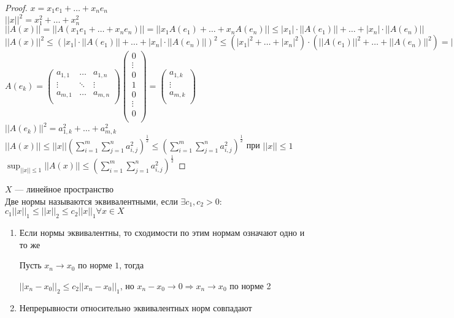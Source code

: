 \begin{proof}
$x = x_1e_1 + \dots + x_n e_n$ \\
$||x||^2 = x_1^2 + \dots + x_n^2$ \\
$||A(x)|| = ||A(x_1e_1 + \dots + x_n e_n)|| = ||x_1A(e_1) + \dots + x_nA(e_n)|| \le |x_1| \cdot ||A(e_1)|| + \dots + |x_n| \cdot ||A(e_n)||$ \\
$||A(x)||^2 \le (|x_1| \cdot ||A(e_1)|| + \dots + |x_n| \cdot ||A(e_n)||) ^ 2 \le (|x_1| ^ 2 + \dots + |x_n|^2) \cdot (||A(e_1)||^2 + \dots + ||A(e_n)||^2) = ||x^2|| (||A(e_1)||^2 + \dots + ||A(e_n)||^2) = ||x||^2$\\
$A(e_k) = 
\begin{pmatrix}
a_{1, 1} & \dots & a_{1, n}\\
\vdots & \ddots & \vdots\\
a_{m, 1} & \dots & a_{m, n}\\
\end{pmatrix}
\begin{pmatrix}
0\\
\vdots\\
0\\
1\\
0\\
\vdots\\
0\\
\end{pmatrix} = 
\begin{pmatrix}
a_{1, k}\\
\vdots\\
a_{m, k}\\
\end{pmatrix}$\\
$||A(e_k)||^2 = a_{1, k}^2 + \dots + a_{m, k}^2$\\
$||A(x)|| \le ||x||(\sum_{i = 1}^m \sum_{j = 1}^n a_{i, j}^2)^{\frac{1}{2}} \le (\sum_{i = 1}^m \sum_{j = 1}^n a_{i, j}^2)^{\frac{1}{2}}$ при $||x|| \le 1$\\
$\sup_{||x|| \le 1}||A(x)|| \le (\sum_{i = 1}^m \sum_{j = 1}^n a_{i, j}^2)^{\frac{1}{2}}$
\end{proof}
\begin{Def}
$X$ --- линейное пространство\\
Две нормы называются эквивалентными, если $\exists c_1, c_2 > 0 \colon$\\
$c_1||x||_1 \le ||x||_2 \le c_2||x||_1 \forall x \in X$\\
\end{Def}
\begin{Rem}


\begin{enumerate}
\item Если нормы эквивалентны, то сходимости по этим нормам означают одно и то же

Пусть $x_n \rightarrow x_0$ по норме  $1$, тогда

$||x_n - x_0||_2 \le c_2||x_n - x_0||_1$, но $x_n - x_0 \rightarrow 0 \Rightarrow x_n \rightarrow x_0$ по норме 2

\item Непрерывности относительно эквивалентных норм совпадают
\end{enumerate}
\end{Rem}

